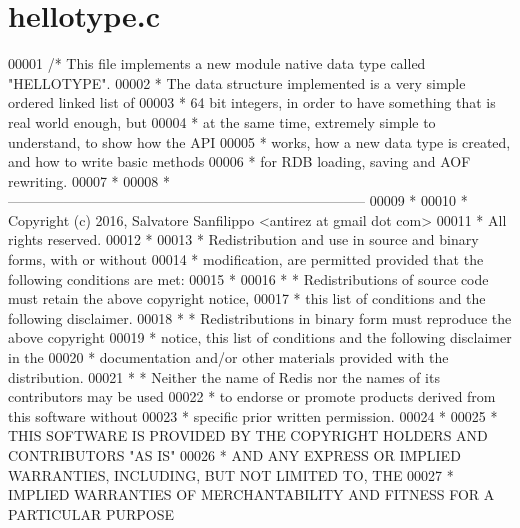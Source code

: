 \hypertarget{hellotype_8c_source}{}\section{hellotype.\+c}
\label{hellotype_8c_source}

\begin{DoxyCode}
00001 \textcolor{comment}{/* This file implements a new module native data type called "HELLOTYPE".}
00002 \textcolor{comment}{ * The data structure implemented is a very simple ordered linked list of}
00003 \textcolor{comment}{ * 64 bit integers, in order to have something that is real world enough, but}
00004 \textcolor{comment}{ * at the same time, extremely simple to understand, to show how the API}
00005 \textcolor{comment}{ * works, how a new data type is created, and how to write basic methods}
00006 \textcolor{comment}{ * for RDB loading, saving and AOF rewriting.}
00007 \textcolor{comment}{ *}
00008 \textcolor{comment}{ * -----------------------------------------------------------------------------}
00009 \textcolor{comment}{ *}
00010 \textcolor{comment}{ * Copyright (c) 2016, Salvatore Sanfilippo <antirez at gmail dot com>}
00011 \textcolor{comment}{ * All rights reserved.}
00012 \textcolor{comment}{ *}
00013 \textcolor{comment}{ * Redistribution and use in source and binary forms, with or without}
00014 \textcolor{comment}{ * modification, are permitted provided that the following conditions are met:}
00015 \textcolor{comment}{ *}
00016 \textcolor{comment}{ *   * Redistributions of source code must retain the above copyright notice,}
00017 \textcolor{comment}{ *     this list of conditions and the following disclaimer.}
00018 \textcolor{comment}{ *   * Redistributions in binary form must reproduce the above copyright}
00019 \textcolor{comment}{ *     notice, this list of conditions and the following disclaimer in the}
00020 \textcolor{comment}{ *     documentation and/or other materials provided with the distribution.}
00021 \textcolor{comment}{ *   * Neither the name of Redis nor the names of its contributors may be used}
00022 \textcolor{comment}{ *     to endorse or promote products derived from this software without}
00023 \textcolor{comment}{ *     specific prior written permission.}
00024 \textcolor{comment}{ *}
00025 \textcolor{comment}{ * THIS SOFTWARE IS PROVIDED BY THE COPYRIGHT HOLDERS AND CONTRIBUTORS "AS IS"}
00026 \textcolor{comment}{ * AND ANY EXPRESS OR IMPLIED WARRANTIES, INCLUDING, BUT NOT LIMITED TO, THE}
00027 \textcolor{comment}{ * IMPLIED WARRANTIES OF MERCHANTABILITY AND FITNESS FOR A PARTICULAR PURPOSE}

\end{DoxyCode}
